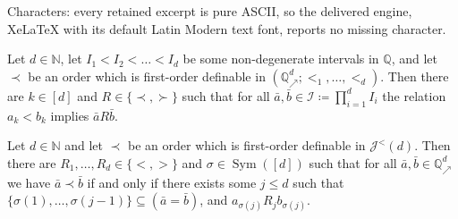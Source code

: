 \documentclass[10pt,a4paper]{amsart}
\newcommand\johnord[1]{\mathcal{J}^{<}(#1)}
\newcommand\qup[1]{\mathbb{Q}_\nearrow^{#1}}
\newcommand{\Sym}{\operatorname{Sym}}
\begin{document}
Characters: every retained excerpt is pure ASCII, so the delivered engine, XeLaTeX with its default Latin Modern text font, reports no missing character.
\begin{lemma}\label{most_sign}
	Let $d\in \mathbb{N}$, let $I_1<I_2<\dots<I_d$ be some non-degenerate intervals in $\mathbb{Q}$,
    and let $\prec$ be an order which is first-order definable in $(\qup{d};<_1,\dots,<_d)$. Then there are $k\in [d]$ and $R\in \{\prec,\succ\}$ such that for all $\bar{a},\bar{b}\in \mathcal{I}\coloneqq \prod_{i=1}^dI_i$ the relation $a_k<b_k$ implies $\bar{a}R\bar{b}$.
\end{lemma}

\begin{lemma}\label{lexicographic}
	Let $d\in \mathbb{N}$ and let $\prec$ be an order which is first-order definable in $\johnord{d}$. Then there are  $R_1,\dots,R_d\in \{<,>\}$ and $\sigma \in \Sym([d])$ such that for all $\bar{a},\bar{b}\in \qup{d}$ we have $\bar{a}\prec \bar{b}$ if and only if there exists some $j\leq d$ such that 
    $\{\sigma(1),\dots,\sigma({j-1})\} \subseteq (\bar{a}=\bar{b})$, and $a_{\sigma(j)}R_jb_{\sigma(j)}$.
\end{lemma}
\end{document}
